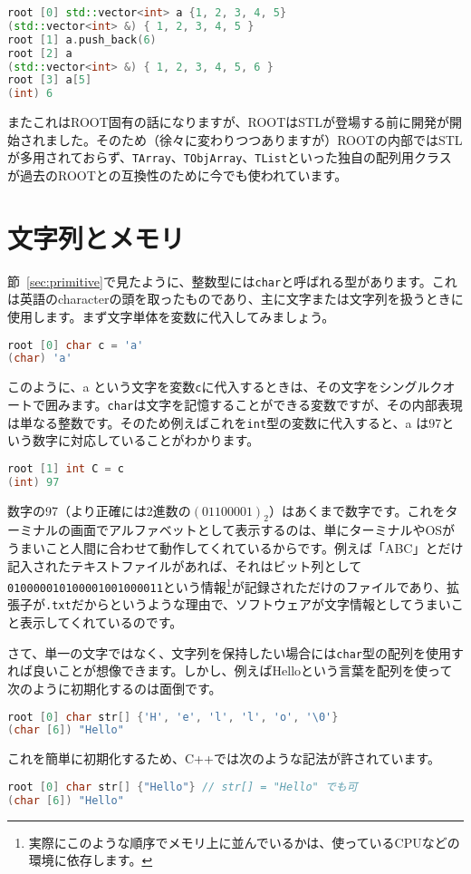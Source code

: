 \begin{lstlisting}[language=c++]
root [0] std::vector<int> a {1, 2, 3, 4, 5}
(std::vector<int> &) { 1, 2, 3, 4, 5 }
root [1] a.push_back(6)
root [2] a
(std::vector<int> &) { 1, 2, 3, 4, 5, 6 }
root [3] a[5]
(int) 6
\end{lstlisting}

またこれはROOT固有の話になりますが、ROOTはSTLが登場する前に開発が開始されました。そのため（徐々に変わりつつありますが）ROOTの内部ではSTLが多用されておらず、\texttt{TArray}、\texttt{TObjArray}、\texttt{TList}といった独自の配列用クラスが過去のROOTとの互換性のために今でも使われています。

\section{文字列とメモリ}
節~\ref{sec:primitive}で見たように、整数型には\texttt{char}と呼ばれる型があります。これは英語のcharacterの頭を取ったものであり、主に文字または文字列を扱うときに使用します。まず文字単体を変数に代入してみましょう。
\begin{lstlisting}[language=c++]
root [0] char c = 'a'
(char) 'a'
\end{lstlisting}
このように、a という文字を変数\texttt{c}に代入するときは、その文字をシングルクオートで囲みます。\texttt{char}は文字を記憶することができる変数ですが、その内部表現は単なる整数です。そのため例えばこれを\texttt{int}型の変数に代入すると、a は97という数字に対応していることがわかります。
\begin{lstlisting}[language=c++]
root [1] int C = c
(int) 97
\end{lstlisting}

数字の97（より正確には2進数の$(01100001)_2$）はあくまで数字です。これをターミナルの画面でアルファベットとして表示するのは、単にターミナルやOSがうまいこと人間に合わせて動作してくれているからです。例えば「ABC」とだけ記入されたテキストファイルがあれば、それはビット列として\texttt{010000010100001001000011}という情報\footnote{実際にこのような順序でメモリ上に並んでいるかは、使っているCPUなどの環境に依存します。}が記録されただけのファイルであり、拡張子が\texttt{.txt}だからというような理由で、ソフトウェアが文字情報としてうまいこと表示してくれているのです。

さて、単一の文字ではなく、文字列を保持したい場合には\texttt{char}型の配列を使用すれば良いことが想像できます。しかし、例えばHelloという言葉を配列を使って次のように初期化するのは面倒です。
\begin{lstlisting}[language=c++]
root [0] char str[] {'H', 'e', 'l', 'l', 'o', '\0'}
(char [6]) "Hello"
\end{lstlisting}
これを簡単に初期化するため、C++では次のような記法が許されています。
\begin{lstlisting}[language=c++]
root [0] char str[] {"Hello"} // str[] = "Hello" でも可
(char [6]) "Hello"
\end{lstlisting}

